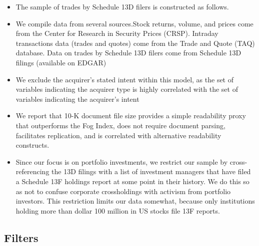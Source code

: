 \documentclass[12pt]{article}
\begin{document}
    \begin{itemize}
        
        \item The sample of trades by Schedule 13D filers is constructed as follows.\citep{Collin-Dufresne2015}

        \item We compile data from several sources.Stock returns, volume, and prices come from the Center for Research in Security Prices (CRSP). Intraday transactions data (trades and quotes) come from the Trade and Quote (TAQ) database. Data on trades by Schedule 13D filers come from Schedule 13D filings (available on EDGAR) \citep{Collin-Dufresne2015}

        \item We exclude the acquirer’s stated intent within this model, as the set of variables indicating the acquirer type is highly correlated with the set of variables indicating the acquirer’s intent \citep{Brigida2012}

        \item We report that 10-K document file size provides a simple readability proxy that outperforms the Fog Index, does not require document parsing, facilitates replication, and is correlated with alternative readability constructs.\citep{Loughran2014}

        \item Since our focus is on portfolio investments, we restrict our sample by cross-referencing the 13D filings with a list of investment managers that have filed a Schedule 13F holdings report at some point in their history. We do this so as not to confuse corporate crossholdings with activism from portfolio investors. This restriction limits our data somewhat, because only institutions holding more than dollar 100 million in US stocks file 13F reports. \citep{Greenwood2009}
    \end{itemize}

\subsection{Filters}
\end{document}
